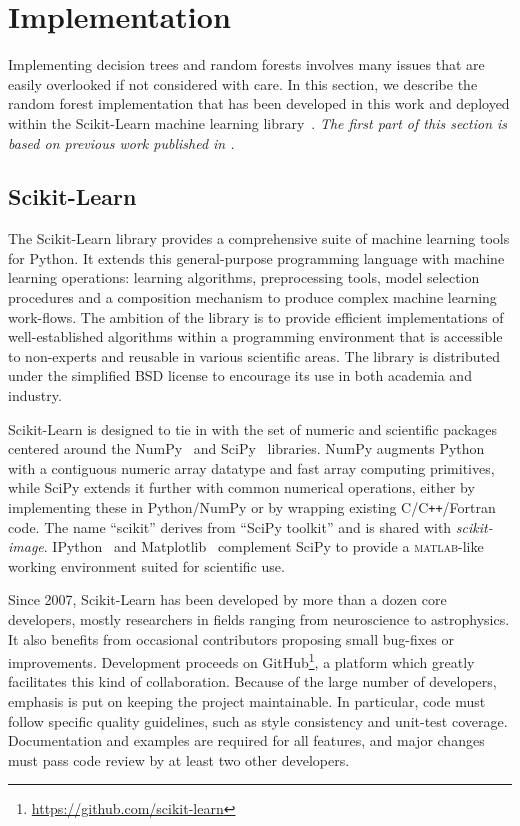 \todo{}



\section{Implementation}
\label{sec:5:impl}

Implementing decision trees and random forests involves many issues that are
easily overlooked if not considered with care. In this section, we describe the
random forest implementation that has been developed in this work and
deployed within the Scikit-Learn machine learning
library~\citep{pedregosa:2011}. \textit{The first part of this section is based
on previous work published in \citep{buitinck:2013}.}

\subsection{Scikit-Learn}

The Scikit-Learn library provides a comprehensive suite of machine learning
tools for Python. It extends this general-purpose programming language with
machine learning operations: learning algorithms, preprocessing tools, model
selection procedures and a composition mechanism to produce complex machine
learning work-flows. The ambition of the library is to provide efficient
implementations of well-established algorithms within a programming environment
that is accessible to non-experts and reusable in various scientific areas. The
library is distributed under the simplified BSD license to encourage its use in
both academia and industry.

Scikit-Learn is designed to tie in with the set of numeric and scientific
packages centered around the NumPy~\citep{oliphant:2007} and
SciPy~\citep{vanderwalt:2011} libraries. NumPy augments Python with a
contiguous numeric array datatype and fast array computing primitives, while
SciPy extends it further with common numerical operations, either by
implementing these in Python/NumPy or by wrapping existing
C/C{}\verb!++!/Fortran code. The name ``scikit'' derives from ``SciPy toolkit''
and is shared with \textit{scikit-image}. IPython~\citep{perez:2007} and
Matplotlib~\citep{hunter:2007} complement SciPy to provide a
\textsc{matlab}-like working environment suited for scientific use.

Since 2007, Scikit-Learn has been developed by more than a dozen core
developers, mostly researchers in fields ranging from neuro\-science to
astro\-physics. It also benefits from occasional contributors proposing small
bug-fixes or improvements. Development proceeds on
GitHub\footnote{\url{https://github.com/scikit-learn}}, a platform which
greatly facilitates this kind of collaboration. Because of the large number of
developers, emphasis is put on keeping the project maintainable. In particular,
code must follow specific quality guidelines, such as style consistency and
unit-test coverage. Documentation and examples are required for all features,
and major changes must pass code review by at least two other developers.

